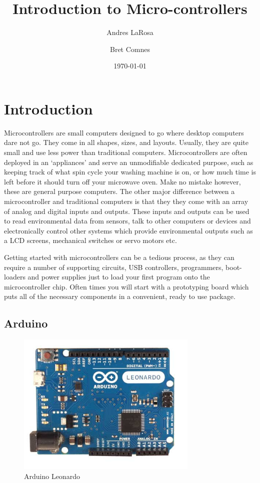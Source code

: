 \documentclass[11pt,a4paper]{article}
\begin{document}
\title{Introduction to Micro-controllers}
\date{\today} 
\author{Andres LaRosa}
\author{Bret Comnes}
\maketitle

\section{Introduction} %
\label{sec:introduction}

Microcontrollers are small computers designed to go where desktop computers dare not go.  They come in all shapes, sizes, and layouts.  Usually, they are quite small and use less power than traditional computers.  Microcontrollers are often deployed in an `appliances' and serve an unmodifiable dedicated purpose, such as keeping track of what spin cycle your washing machine is on, or how much time is left before it should turn off your microwave oven.  Make no mistake however, these are general purpose computers.  The other major difference between a microcontroller and traditional computers is that they they come with an array of analog and digital inputs and outputs. These inputs and outputs can be used to read environmental data from sensors, talk to other computers or devices and electronically control other systems which provide environmental outputs such as a LCD screens, mechanical switches or servo motors etc.  \cite{wpmicro}

Getting started with microcontrollers can be a tedious process, as they can require a number of supporting circuits, USB controllers, programmers, boot-loaders and power supplies just to load your first program onto the microcontroller chip.  Often times you will start with a prototyping board which puts all of the necessary components in a convenient, ready to use package.

\subsection{Arduino} %
\label{sub:arduino}

\begin{figure}[htbp]
	\centering
		\includegraphics[height=2.7in]{figures/ArduinoLeonardoFront_2_450px.jpg}
	\caption{Arduino Leonardo\cite{leonardo}}
	\label{fig:figures_ArduinoLeonardoFront_2_450px}
\end{figure}
\end{document}
